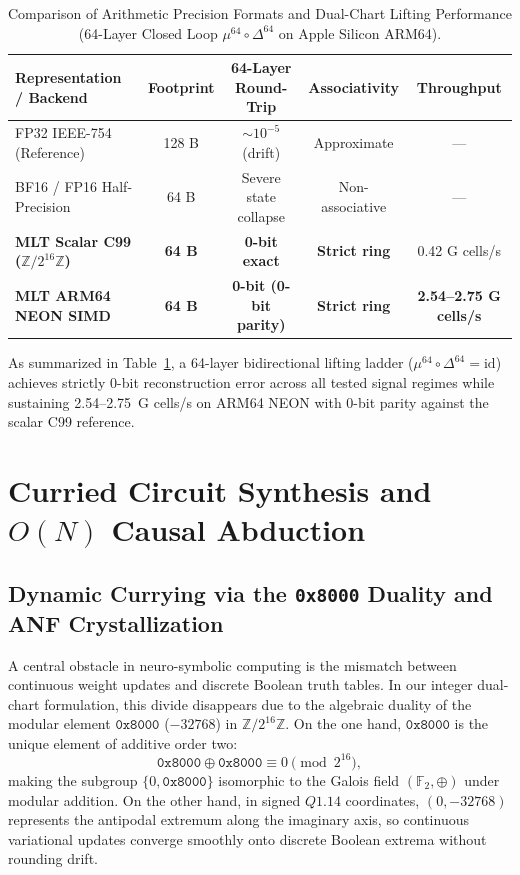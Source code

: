 \documentclass[11pt, a4paper]{article}
\begin{document}
\begin{table}[htbp]
\centering
\small
\caption{Comparison of Arithmetic Precision Formats and Dual-Chart Lifting Performance (64-Layer Closed Loop $\mu^{64} \circ \Delta^{64}$ on Apple Silicon ARM64).}
\label{tab:dual_chart_bench}
\begin{tabularx}{\textwidth}{@{}Xcccc@{}}
\toprule
\textbf{Representation / Backend} & \textbf{Footprint} & \textbf{64-Layer Round-Trip} & \textbf{Associativity} & \textbf{Throughput} \\
\midrule
FP32 IEEE-754 (Reference) & 128 B & $\sim 10^{-5}$ (drift) & Approximate & --- \\
BF16 / FP16 Half-Precision & 64 B & Severe state collapse & Non-associative & --- \\
\textbf{MLT Scalar C99 ($\mathbb{Z}/2^{16}\mathbb{Z}$)} & \textbf{64 B} & \textbf{0-bit exact} & \textbf{Strict ring} & 0.42 G cells/s \\
\textbf{MLT ARM64 NEON SIMD} & \textbf{64 B} & \textbf{0-bit (0-bit parity)} & \textbf{Strict ring} & \textbf{2.54--2.75 G cells/s} \\
\bottomrule
\end{tabularx}
\end{table}

As summarized in Table~\ref{tab:dual_chart_bench}, a 64-layer bidirectional lifting ladder ($\mu^{64} \circ \Delta^{64} = \mathrm{id}$) achieves strictly 0-bit reconstruction error across all tested signal regimes while sustaining 2.54--2.75~G cells/s on ARM64 NEON with 0-bit parity against the scalar C99 reference.

\section{Curried Circuit Synthesis and $O(N)$ Causal Abduction}
\label{sec:abduction}

\subsection{Dynamic Currying via the \texttt{0x8000} Duality and ANF Crystallization}
A central obstacle in neuro-symbolic computing is the mismatch between continuous weight updates and discrete Boolean truth tables. In our integer dual-chart formulation, this divide disappears due to the algebraic duality of the modular element $\texttt{0x8000}$ ($-32768$) in $\mathbb{Z}/2^{16}\mathbb{Z}$. On the one hand, $\texttt{0x8000}$ is the unique element of additive order two:
\begin{equation}
    \texttt{0x8000} \oplus \texttt{0x8000} \equiv 0 \pmod{2^{16}},
\end{equation}
making the subgroup $\{0, \texttt{0x8000}\}$ isomorphic to the Galois field $(\mathbb{F}_2, \oplus)$ under modular addition. On the other hand, in signed $Q1.14$ coordinates, $(0, -32768)$ represents the antipodal extremum along the imaginary axis, so continuous variational updates converge smoothly onto discrete Boolean extrema without rounding drift.
\end{document}
